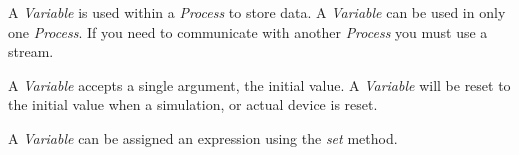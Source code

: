\documentclass[letterpaper,10pt,english]{sphinxmanual}
\begin{document}

\begin{fulllineitems}
\label{language_reference/index:chips.Process}
\end{fulllineitems}


\begin{fulllineitems}
\label{language_reference/index:chips.Variable}
A \emph{Variable} is used within a \emph{Process} to store data. A \emph{Variable} can
be used in only one \emph{Process}. If you need to communicate with another
\emph{Process} you must use a stream.

A \emph{Variable} accepts a single argument, the initial value. A \emph{Variable}
will be reset to the initial value when a simulation, or actual device is
reset.

A \emph{Variable} can be assigned an expression using the \emph{set} method.

\end{fulllineitems}

\end{document}
